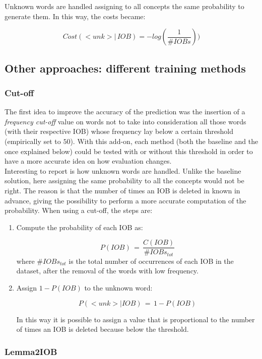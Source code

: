 \documentclass[11pt,a4paper]{article}
\begin{document}
	Unknown words are handled assigning to all concepts the same probability to generate them. In this way, the costs became:

	\[Cost(<unk>|\,IOB)=-log(\frac{1}{\#IOBs})) \]	

\subsection{Other approaches: different training methods}
\label{ssec:otherapp}



\subsubsection{Cut-off}

The first idea to improve the accuracy of the prediction was the insertion of a \textit{frequency cut-off} value on words not to take into consideration all those words (with their respective IOB) whose frequency lay below a certain threshold (empirically set to $50$). With this add-on, each method (both the baseline and the once explained below) could be tested with or without this threshold in order to have a more accurate idea on how evaluation changes.\\

Interesting to report is how unknown words are handled. Unlike the baseline solution, here assigning the same probability to all the concepts would not be right. The reason is that the number of times an IOB is deleted in known in advance, giving the possibility to perform a more accurate computation of the probability. When using a cut-off, the steps are:
\begin{enumerate}
	\item Compute the probability of each IOB as:
	
		\[P(IOB)\,=\,\frac{C(IOB)}{\#IOBs_{tot}}\]
	where $\#IOBs_{tot}$ is the total number of occurrences of each IOB in the dataset, after the removal of the words with low frequency.
	\item Assign $1-P(IOB)$ to the unknown word:
	
		\[P(<unk>|IOB)\,=\,1-P(IOB)\]
		
		In this way it is possible to assign a value that is proportional to the number of times an IOB is deleted because below the threshold.
\end{enumerate}

\subsubsection{Lemma2IOB}
\end{document}
